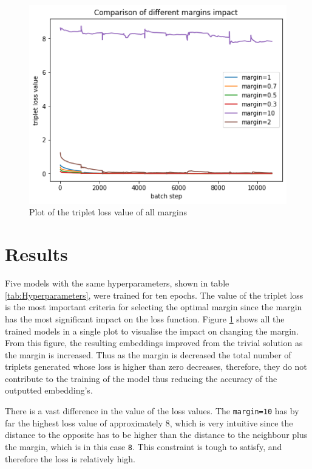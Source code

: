 \documentclass[twocolumn]{article}
\begin{document}
\begin{figure}[t]
\centering
    \includegraphics[width=\linewidth]{assets/margin_all_plot.png}
    \caption{Plot of the triplet loss value of all margins}
    \label{fig:margin-all}
\end{figure}

\section{Results}

Five models with the same hyperparameters, shown in table \ref{tab:Hyperparameters}, were trained for ten epochs. The value of the triplet loss is the most important criteria for selecting the optimal margin since the margin has the most significant impact on the loss function. Figure \ref{fig:margin-all} shows all the trained models in a single plot to visualise the impact on changing the margin. From this figure, the resulting embeddings improved from the trivial solution as the margin is increased. Thus as the margin is decreased the total number of triplets generated whose loss is higher than zero decreases, therefore, they do not contribute to the training of the model thus reducing the accuracy of the outputted embedding’s.

There is a vast difference in the value of the loss values. The \texttt{margin=10} has by far the highest loss value of approximately 8, which is very intuitive since the distance to the opposite has to be higher than the distance to the neighbour plus the margin, which is in this case \texttt{8}. This constraint is tough to satisfy, and therefore the loss is relatively high.
\end{document}
